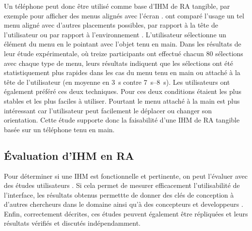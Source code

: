 
Un téléphone peut donc être utilisé comme base d'IHM de RA tangible, par exemple pour afficher des menus alignés avec l'écran . \cite{White2009} ont comparé l'usage un tel menu aligné avec d'autres placements possibles, par rapport à la tête de l'utilisateur ou par rapport à l'environnement . L'utilisateur sélectionne un élément du menu en le pointant avec l'objet tenu en main. Dans les résultats de leur étude expérimentale, où treize participants ont effectué chacun 80 sélections avec chaque type de menu, leurs résultats indiquent que les sélections ont été statistiquement plus rapides dans les cas du menu tenu en main ou attaché à la tête de l'utilisateur (en moyenne en \SI{3}{\s} contre \SIrange{7}{8}{\s}). Les utilisateurs ont également préféré ces deux techniques. Pour \citeauthor{White2009} ces deux conditions étaient les plus stables et les plus faciles à utiliser. Pourtant le menu attaché à la main est plus intéressant car l'utilisateur peut facilement le déplacer ou changer son orientation. Cette étude supporte donc la faisabilité d'une IHM de RA tangible basée sur un téléphone tenu en main.

\subsection{Évaluation d'IHM en RA}
\label{subsec:litterature_ar_hci_evaluation}
Pour déterminer si une IHM est fonctionnelle et pertinente, on peut l'évaluer avec des études utilisateurs \citep[p. 189]{Billinghurst2015}. Si cela permet de mesurer efficacement l'utilisabilité de l'interface, les résultats obtenus permettte de donner des clés de conception à d'autres chercheurs dans le domaine ainsi qu'à des concepteurs et developpeurs \citep[p. 20]{Jankowski2015}. Enfin, correctement décrites, ces études peuvent également être répliquées et leurs résultats vérifiés et discutés indépendamment.

